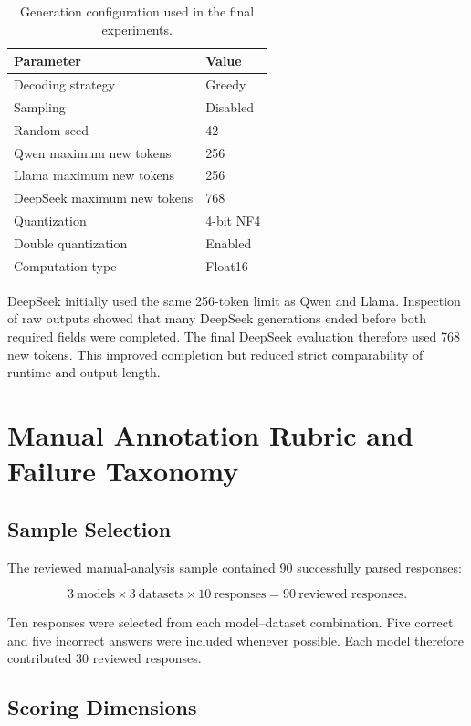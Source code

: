\documentclass{article}
\begin{document}
\begin{table}[t]
\centering
\small
\caption{Generation configuration used in the final experiments.}
\label{tab:appendix_generation}
\begin{tabular}{ll}
\toprule
\textbf{Parameter} & \textbf{Value} \\
\midrule
Decoding strategy & Greedy \\
Sampling & Disabled \\
Random seed & 42 \\
Qwen maximum new tokens & 256 \\
Llama maximum new tokens & 256 \\
DeepSeek maximum new tokens & 768 \\
Quantization & 4-bit NF4 \\
Double quantization & Enabled \\
Computation type & Float16 \\
\bottomrule
\end{tabular}
\end{table}

DeepSeek initially used the same 256-token limit as Qwen and Llama. Inspection
of raw outputs showed that many DeepSeek generations ended before both required
fields were completed. The final DeepSeek evaluation therefore used 768 new
tokens. This improved completion but reduced strict comparability of runtime
and output length.

\section{Manual Annotation Rubric and Failure Taxonomy}
\label{app:annotation}

\subsection{Sample Selection}

The reviewed manual-analysis sample contained 90 successfully parsed
responses:

\[
3\ \text{models}
\times
3\ \text{datasets}
\times
10\ \text{responses}
=
90\ \text{reviewed responses}.
\]

Ten responses were selected from each model--dataset combination. Five correct
and five incorrect answers were included whenever possible. Each model
therefore contributed 30 reviewed responses.

\subsection{Scoring Dimensions}
\end{document}
